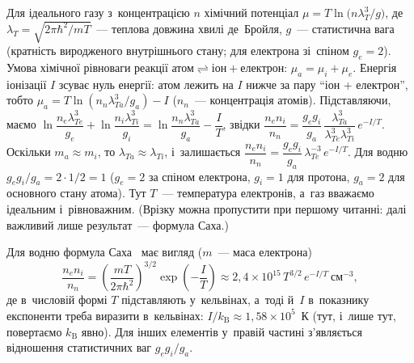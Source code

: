 \begin{Theory}
Для ідеального газу з~концентрацією $n$ хімічний потенціал
$\mu=T\ln\bigl(n\lambda_T^3/g\bigr)$, де
$\lambda_T=\sqrt{2\pi\hbar^2/mT}$~--- теплова довжина хвилі де~Бройля, $g$~--- статистична вага (кратність виродженого внутрішнього стану; для електрона зі~спіном $g_e=2$).
Умова хімічної рівноваги реакції $\text{атом}\rightleftharpoons\text{іон}+\text{електрон}$:
$\mu_a=\mu_i+\mu_e$. Енергія іонізації $I$ зсуває нуль енергії: атом лежить на $I$ нижче за
пару \enquote{іон + електрон}, тобто $\mu_a=T\ln(n_n\lambda_{Ta}^3/g_a)-I$ ($n_n$~--- концентрація атомів). Підставляючи, маємо
$\ln\dfrac{n_e\lambda_{Te}^3}{g_e}+\ln\dfrac{n_i\lambda_{Ti}^3}{g_i}=\ln\dfrac{n_n\lambda_{Ta}^3}{g_a}-\dfrac IT$,
звідки
$\dfrac{n_en_i}{n_n}=\dfrac{g_eg_i}{g_a}\,\dfrac{\lambda_{Ta}^3}{\lambda_{Te}^3\lambda_{Ti}^3}\,e^{-I/T}$.
Оскільки $m_a\approx m_i$, то $\lambda_{Ta}\approx\lambda_{Ti}$, і~залишається
$\dfrac{n_en_i}{n_n}=\dfrac{g_eg_i}{g_a}\,\lambda_{Te}^{-3}\,e^{-I/T}$.
Для водню $g_eg_i/g_a=2\cdot1/2=1$ ($g_e=2$ за спіном електрона, $g_i=1$ для протона, $g_a=2$ для основного стану атома). Тут $T$~--- температура електронів, а~газ вважаємо ідеальним і~рівноважним.
(Врізку можна пропустити при першому читанні: далі важливий лише результат~--- формула Саха.)
\end{Theory}

Для водню формула Саха~\cite{chen2016introduction} має вигляд ($m$~--- маса електрона)
\begin{equation}\label{eq:saha}
	\frac{n_e n_i}{n_n} = \left(\frac{m T}{2\pi\hbar^2}\right)^{3/2}\exp\left(-\frac{I}{T}\right)
	\approx 2{,}4\times10^{15}\,T^{3/2}\,e^{-I/T}~\mathrm{см}^{-3},
\end{equation}
де в~числовій формі $T$ підставляють у~кельвінах, а~тоді й~$I$ в~показнику експоненти
треба виразити в~кельвінах: $I/k_{\mathrm B}\approx1{,}58\times10^{5}$~К (тут, і~лише тут, повертаємо $k_{\mathrm B}$ явно). Для інших
елементів у~правій частині з'являється відношення статистичних ваг $g_eg_i/g_a$.

